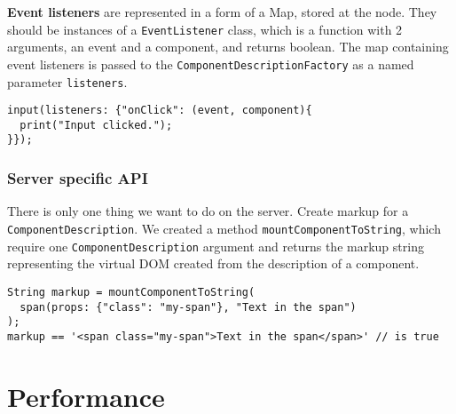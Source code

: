 \documentclass[oneside, 12pt]{book}
\begin{document}


    \textbf{Event listeners} are represented in a form of a Map, stored at the node. 
    They should be instances of a \texttt{EventListener} class, which is a function with 2 arguments, an event and a component, and returns boolean.
		The map containing event listeners is passed to the \texttt{ComponentDescriptionFactory} as a named parameter \texttt{listeners}.

\begin{verbatim}
input(listeners: {"onClick": (event, component){
  print("Input clicked.");
}});
\end{verbatim}



  \subsection{Server specific API}\label{subsec:our-api-server}

    There is only one thing we want to do on the server. Create markup for a \texttt{ComponentDescription}.
    We created a method \texttt{mountComponentToString}, 
		which require one \texttt{ComponentDescription} argument and returns the markup string representing the virtual DOM created from the description of a component.
\begin{verbatim}
String markup = mountComponentToString(
  span(props: {"class": "my-span"}, "Text in the span")
);
markup == '<span class="my-span">Text in the span</span>' // is true
\end{verbatim}




\chapter{Performance}\label{chap:performance}

\end{document}
